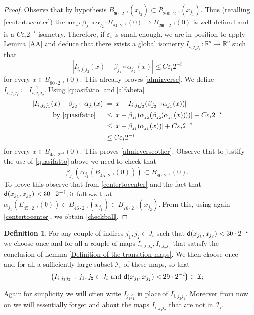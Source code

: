 \documentclass[11pt]{article}
\newcommand{\eps}{\varepsilon}
\newcommand{\rr}{\mathbb{R}}
\newcommand{\sfd}{{\sf d}}
\theoremstyle{plain}
\theoremstyle{definition}
\newtheorem{definition}[theorem]{Definition}
\numberwithin{equation}{section}
\begin{document}
\begin{proof}
	Observe that by hypothesis  $B_{90 \cdot 2^{-i}}(x_{j_2}) \subset B_{200\cdot 2^{-i}}(x_{j_1})$. Thus (recalling \eqref{centertocenter}) the map  $\beta_{j_1} \circ \alpha_{j_2} : B_{80 \cdot 2^{-i}}(0) \to {B_{200 \cdot 2^{-i}}(0)}$ is well defined and is a $C\eps_i 2^{-i}$ isometry. Therefore, if $\eps_i$ is small enough, we are in position to apply Lemma \ref{AA} and deduce that there exists a global isometry $I_{i,j_2j_1}: \rr^n \to \rr^n$ such that
	\begin{equation}\label{quasifatto}
		|I_{i,j_1j_2}(x)-\beta_{j_1} \circ \alpha_{j_2}(x) |\le C\eps_i 2^{-i}
	\end{equation} 
	for every $x \in B_{80\cdot2^{-i}}(0)$.
	This already proves \eqref{alminverse}. We  define $I_{i,j_2j_1}\coloneqq I_{i,j_1j_2}^{-1}$. Using \eqref{quasifatto} and \eqref{alfabeta}
	\begin{align*}
		|I_{i,j_2j_1}(x)-\beta_{j_2} \circ \alpha_{j_1}(x) |&=|x-I_{i,j_1j_2}(\beta_{j_2} \circ \alpha_{j_1}(x))|\\
	\text{by \eqref{quasifatto} \quad}	&\le|x-\beta_{j_1}(\alpha_{j_2}(\beta_{j_2}( \alpha_{j_1}(x)))) |+C\eps_i 2^{-i}\\
		&\le |x-\beta_{j_1}( \alpha_{j_1}(x)) |+C\eps_i 2^{-i}\\
		&\le C\eps_i2^{-i}
	\end{align*}
	for every $x \in B_{45 \cdot 2^{-i}}(0).$ This proves \eqref{alminverseother}. Observe that to justify the use of \eqref{quasifatto}  above we need to check that
	\begin{equation}\label{checkball}
		\beta_{j_2}(\alpha_{j_1}(B_{45\cdot 2^{-i}}(0)))\subset B_{80\cdot 2^{-i}}(0).
	\end{equation}
	To prove this observe that  from \eqref{centertocenter} and the fact that $\sfd(x_{j_1},x_{j_2})<30\cdot 2^{-i}$, it follows that $\alpha_{j_1}(B_{45\cdot 2^{-i}}(0))\subset B_{46 \cdot 2^{-i}}(x_{j_1})\subset B_{76 \cdot 2^{-i}}(x_{j_2})$.  From this, using again  \eqref{centertocenter}, we obtain \eqref{checkball}.
\end{proof}
\begin{definition}\label{maps}
	For any couple of indices $j_1,j_2 \in J_i$ such that $\sfd(x_{j_1},x_{j_2})<30\cdot 2^{-i}$ we choose once and for all a couple of maps  $I_{i,j_1j_2},I_{i,j_2j_1}$ that satisfy the conclusion of  Lemma \ref{Definition of the transition maps}.
	We then choose once and for all a   sufficiently large  subset $\mathcal I_i$ of these maps, so that
 \begin{equation}\label{eq:def Ii}
   \{I_{i,j_1j_2}\ : j_1,j_2 \in J_i \text{ and }\sfd(x_{j_1},x_{j_2})<29\cdot 2^{-i}\}\subset   \mathcal I_i 
 \end{equation}
\end{definition}
Again for simplicity we will often write $I_{j_2j_1}$ in place of $I_{i,j_2j_1}.$ Moreover from now on we will essentially forget and about the maps $I_{i,j_1j_2}$ that are not in $\mathcal I_i.$
\end{document}
